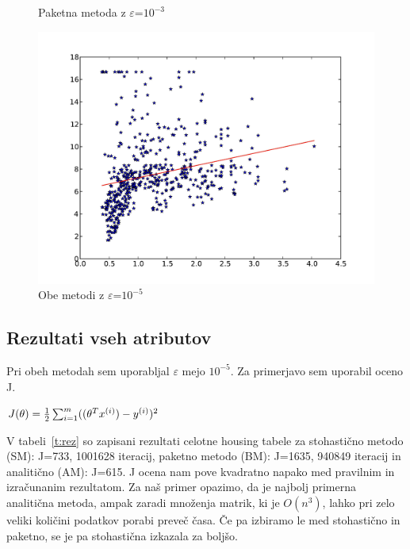 \documentclass[a4paper,11pt]{article}
\begin{document}
\begin{figure}[h!]
\begin{minipage}[b]{0.5\linewidth}
\caption{Paketna metoda z $\varepsilon$=$10^{-3}$}
\includegraphics[scale=0.4]{b52.pdf}
\caption{Obe metodi z $\varepsilon$=$10^{-5}$}
\label{fig:figure2}
\end{minipage}
\end{figure}

\subsection{Rezultati vseh atributov}
Pri obeh metodah sem uporabljal $\varepsilon$ mejo $10^{-5}$. Za primerjavo sem uporabil oceno J.

$J(\theta) = {1\over2} \sum_{i=1}^m ((\theta^Tx^{(i)}) - y^{(i)})^2$

V tabeli~\ref{t:rez} so zapisani rezultati celotne housing tabele za stohastično metodo (SM): J=733, 1001628 iteracij, paketno metodo (BM): J=1635, 940849 iteracij in analitično (AM): J=615. J ocena nam pove kvadratno napako med pravilnim in izračunanim rezultatom. Za naš primer opazimo, da je najbolj primerna analitična metoda, ampak zaradi množenja matrik, ki je $O(n^3)$, lahko pri zelo veliki količini podatkov porabi preveč časa. Če pa izbiramo le med stohastično in paketno, se je pa stohastična izkazala za boljšo. 
\end{document}
